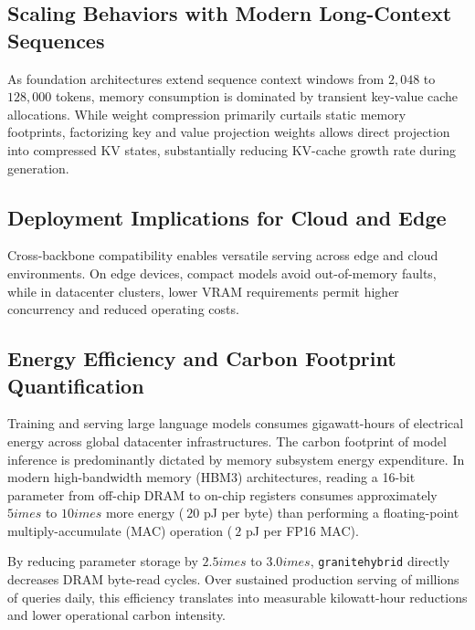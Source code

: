 \subsection{Scaling Behaviors with Modern Long-Context Sequences}
As foundation architectures extend sequence context windows from $2{,}048$ to $128{,}000$ tokens, memory consumption is dominated by transient key-value cache allocations. While weight compression primarily curtails static memory footprints, factorizing key and value projection weights allows direct projection into compressed KV states, substantially reducing KV-cache growth rate during generation.

\subsection{Deployment Implications for Cloud and Edge}
Cross-backbone compatibility enables versatile serving across edge and cloud environments. On edge devices, compact models avoid out-of-memory faults, while in datacenter clusters, lower VRAM requirements permit higher concurrency and reduced operating costs.

\subsection{Energy Efficiency and Carbon Footprint Quantification}
Training and serving large language models consumes gigawatt-hours of electrical energy across global datacenter infrastructures. The carbon footprint of model inference is predominantly dictated by memory subsystem energy expenditure. In modern high-bandwidth memory (HBM3) architectures, reading a 16-bit parameter from off-chip DRAM to on-chip registers consumes approximately $5	imes$ to $10	imes$ more energy ($~20$ pJ per byte) than performing a floating-point multiply-accumulate (MAC) operation ($~2$ pJ per FP16 MAC).

By reducing parameter storage by $2.5	imes$ to $3.0	imes$, \texttt{granitehybrid} directly decreases DRAM byte-read cycles. Over sustained production serving of millions of queries daily, this efficiency translates into measurable kilowatt-hour reductions and lower operational carbon intensity.
